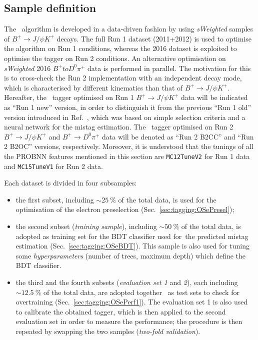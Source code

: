 
\subsection{Sample definition}

The \OSe~algorithm is developed in a data-driven fashion by using \emph{sWeighted} samples of $B^+\to J/\psi K^+$ decays. The full Run 1 dataset (2011+2012) is used to optimise the algorithm on Run 1 conditions, whereas the 2016 dataset is exploited to optimise the tagger on Run 2 conditions. An alternative optimisation on \emph{sWeighted} 2016 $B^+to D^0 \pi^+$ data is performed in parallel. The motivation for this is to cross-check the Run 2 implementation with an independent decay mode, which is characterised by different kinematics than that of $B^+\to J/\psi K^+$.
Hereafter, the \OSe~tagger optimised on Run 1 $B^+\to J/\psi K^+$ data will be indicated as ``Run 1 new'' version, in order to distinguish it from the previous ``Run 1 old'' version introduced in Ref.~\cite{LHCb-PAPER-2011-027}, which was based on simple selection criteria and a neural network for the mistag estimation.  
The \OSe~tagger optimised on Run 2 $B^+\to J/\psi K^+$ and $B^+\to D^0 \pi^+$ data will be denoted as ``Run 2 B2CC'' and ``Run 2 B2OC'' versions, respectively.
Moreover, it is understood that the tunings of all the PROBNN features mentioned in this section are \texttt{MC12TuneV2} for Run 1 data and \texttt{MC15TuneV1} for Run 2 data.

Each dataset is divided in four subsamples:
\begin{itemize}[noitemsep,topsep=0pt]
  \item the first subset, including $\sim 25~\%$ of the total data, is used for the optimisation of the electron preselection (Sec.~\ref{sec:tagging:OSePresel});
    \item the second subset (\emph{training sample}), including $\sim 50~\%$ of the total data, is adopted as training set for the BDT classifier used for\
 the predicted mistag estimation (Sec.~\ref{sec:tagging:OSeBDT}). This sample is also used for tuning some \emph{hyperparameters} (number of trees, maximum depth) which define the BDT classifier.
 \item the third and the fourth subsets (\emph{evaluation set 1} and \emph{2}), each including $\sim 12.5~\%$ of the total data, are adopted together \
as test sets to check for overtraining (Sec.~\ref{sec:tagging:OSePerf1}). The evaluation set 1 is also used to calibrate the obtained tagger, which is then applied to the second evaluation set in order to measure the performance; the procedure is then repeated by swapping the two samples (\emph{two-fold validation}).
\end{itemize}

